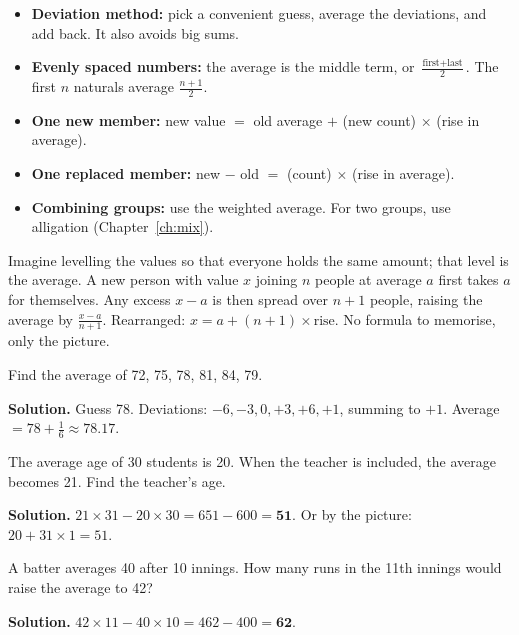 \documentclass[11pt,a4paper,openany]{report}
\begin{document}
\begin{idea}[Tools]
\begin{itemize}[nosep]
\item \textbf{Deviation method:} pick a convenient guess, average the deviations, and add back. It also avoids big sums.
\item \textbf{Evenly spaced numbers:} the average is the middle term, or $\frac{\text{first}+\text{last}}2$. The first $n$ naturals average $\frac{n+1}2$.
\item \textbf{One new member:} new value $=$ old average $+$ (new count) $\times$ (rise in average).
\item \textbf{One replaced member:} new $-$ old $=$ (count) $\times$ (rise in average).
\item \textbf{Combining groups:} use the weighted average. For two groups, use alligation (Chapter~\ref{ch:mix}).
\end{itemize}
\end{idea}

\begin{why}
Imagine levelling the values so that everyone holds the same amount; that level is the average. A new person with value $x$ joining $n$ people at average $a$ first takes $a$ for themselves. Any excess $x-a$ is then spread over $n+1$ people, raising the average by $\frac{x-a}{n+1}$. Rearranged: $x=a+(n+1)\times\text{rise}$. No formula to memorise, only the picture.
\end{why}

\begin{example}
Find the average of 72, 75, 78, 81, 84, 79.

\textbf{Solution.} Guess 78. Deviations: $-6,-3,0,+3,+6,+1$, summing to $+1$. Average $=78+\frac16\approx\mathbf{78.17}$.
\end{example}

\begin{example}
The average age of 30 students is 20. When the teacher is included, the average becomes 21. Find the teacher's age.

\textbf{Solution.} $21\times31-20\times30=651-600=\mathbf{51}$. Or by the picture: $20+31\times1=51$.
\end{example}

\begin{example}
A batter averages 40 after 10 innings. How many runs in the 11th innings would raise the average to 42?

\textbf{Solution.} $42\times11-40\times10=462-400=\mathbf{62}$.
\end{example}
\end{document}
